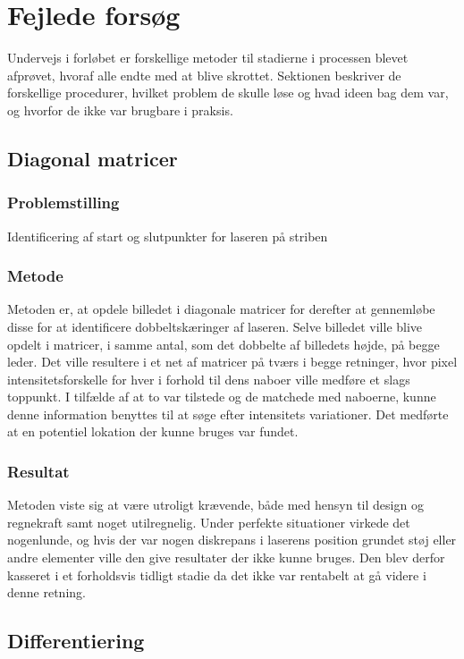 \section{Fejlede forsøg}
Undervejs i forløbet er forskellige metoder til stadierne i processen blevet afprøvet, hvoraf alle endte med at blive skrottet. Sektionen beskriver de forskellige procedurer, hvilket problem de skulle løse og hvad ideen bag dem var, og hvorfor de ikke var brugbare i praksis.

\subsection{Diagonal matricer}

\subsubsection{Problemstilling}
Identificering af start og slutpunkter for laseren på striben

\subsubsection{Metode}
Metoden er, at opdele billedet i diagonale matricer for derefter at gennemløbe disse for at identificere dobbeltskæringer af laseren. Selve billedet ville blive opdelt i matricer, i samme antal, som det dobbelte af billedets højde, på begge leder. Det ville resultere i et net af matricer på tværs i begge retninger, hvor pixel intensitetsforskelle for hver i forhold til dens naboer ville medføre et slags toppunkt. I tilfælde af at to var tilstede og de matchede med naboerne, kunne denne information benyttes til at søge efter intensitets variationer. Det medførte at en potentiel lokation der kunne bruges var fundet.

\subsubsection{Resultat}
Metoden viste sig at være utroligt krævende, både med hensyn til design og regnekraft samt noget utilregnelig. Under perfekte situationer virkede det nogenlunde, og hvis der var nogen diskrepans i laserens position grundet støj eller andre elementer ville den give resultater der ikke kunne bruges. Den blev derfor kasseret i et forholdsvis tidligt stadie da det ikke var rentabelt at gå videre i denne retning.

\subsection{Differentiering}

